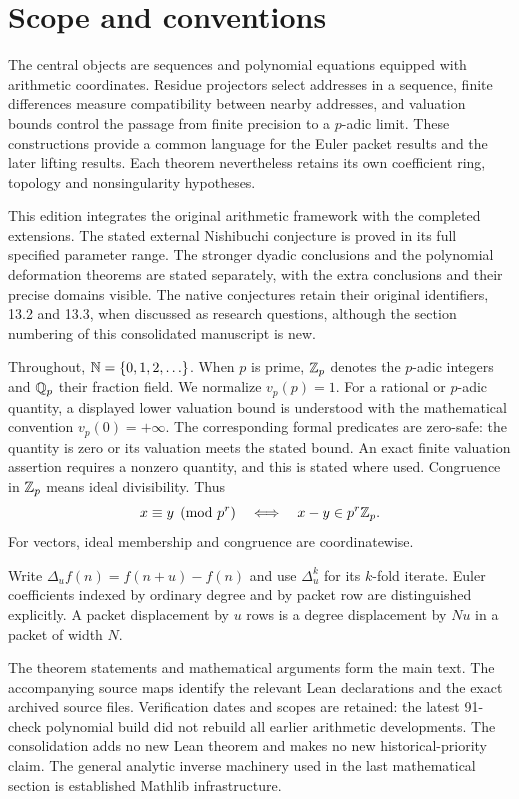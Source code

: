 \section{Scope and conventions}
\label{sec:scope}
The central objects are sequences and polynomial equations equipped with
arithmetic coordinates. Residue projectors select addresses in a sequence,
finite differences measure compatibility between nearby addresses, and
valuation bounds control the passage from finite precision to a $p$-adic
limit. These constructions provide a common language for the Euler packet
results and the later lifting results. Each theorem nevertheless retains its
own coefficient ring, topology and nonsingularity hypotheses.

This edition integrates the original arithmetic framework with the completed
extensions. The stated external Nishibuchi conjecture is proved in its full
specified parameter range. The stronger dyadic conclusions and the polynomial
deformation theorems are stated separately, with the extra conclusions and
their precise domains visible. The native conjectures retain their original
identifiers, 13.2 and 13.3, when discussed as research questions, although the
section numbering of this consolidated manuscript is new.

Throughout, $\mathbb N=\{0,1,2,\ldots\}$. When $p$ is prime, $\mathbb Z_p$ denotes the
$p$-adic integers and $\mathbb Q_p$ their fraction field. We normalize $v_p(p)=1$.
For a rational or $p$-adic quantity, a displayed lower valuation bound is
understood with the mathematical convention $v_p(0)=+\infty$.
The corresponding formal predicates are zero-safe: the quantity is zero or
its valuation meets the stated bound. An exact finite valuation assertion
requires a nonzero quantity, and this is stated where used. Congruence in
$\mathbb Z_p$ means ideal divisibility. Thus
\[
 x\equiv y\pmod{p^r}\quad\Longleftrightarrow\quad
 x-y\in p^r\mathbb Z_p.
\]
For vectors, ideal membership and congruence are coordinatewise.

Write $\Delta_u f(n)=f(n+u)-f(n)$ and use $\Delta_u^k$ for its $k$-fold
iterate. Euler coefficients indexed by ordinary degree and by packet row are
distinguished explicitly. A packet displacement by $u$ rows is a degree
displacement by $Nu$ in a packet of width $N$.

The theorem statements and mathematical arguments form the main text.
The accompanying source maps identify the relevant Lean declarations and
the exact archived source files. Verification dates and scopes are retained:
the latest 91-check polynomial build did not rebuild all earlier arithmetic
developments. The consolidation adds no new Lean theorem and makes no new
historical-priority claim. The general analytic inverse machinery used in the
last mathematical section is established Mathlib infrastructure.
